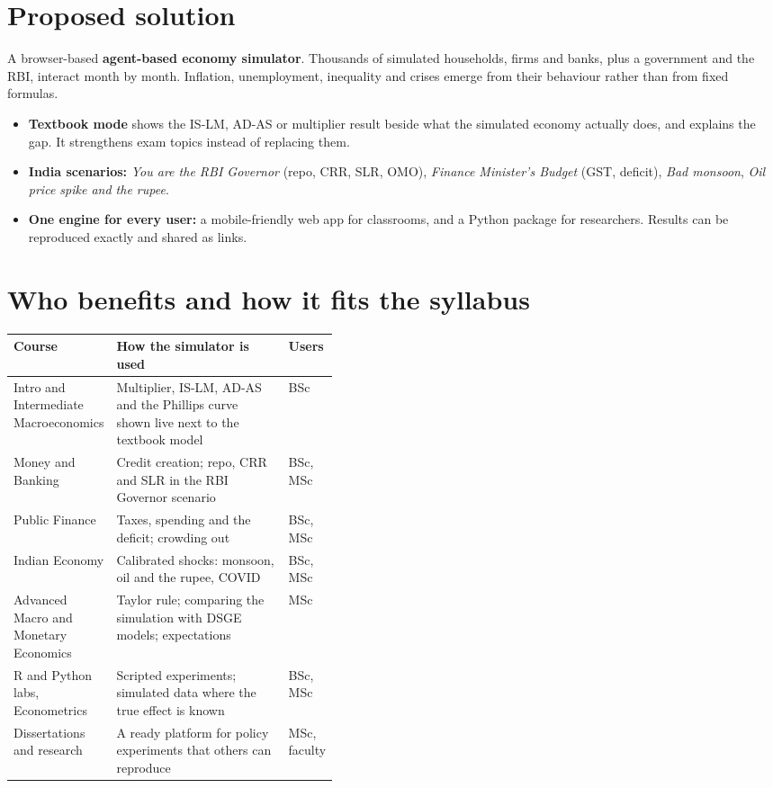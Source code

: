 \documentclass[10pt,a4paper]{article}
\begin{document}
\section{Proposed solution}
A browser-based \textbf{agent-based economy simulator}. Thousands of simulated households, firms and banks, plus a government and the RBI, interact month by month. Inflation, unemployment, inequality and crises emerge from their behaviour rather than from fixed formulas.
\begin{itemize}
  \item \textbf{Textbook mode} shows the IS-LM, AD-AS or multiplier result beside what the simulated economy actually does, and explains the gap. It strengthens exam topics instead of replacing them.
  \item \textbf{India scenarios:} \emph{You are the RBI Governor} (repo, CRR, SLR, OMO), \emph{Finance Minister's Budget} (GST, deficit), \emph{Bad monsoon}, \emph{Oil price spike and the rupee}.
  \item \textbf{One engine for every user:} a mobile-friendly web app for classrooms, and a Python package for researchers. Results can be reproduced exactly and shared as links.
\end{itemize}

\section{Who benefits and how it fits the syllabus}
{\footnotesize
\begin{tabularx}{\linewidth}{@{}>{\raggedright\arraybackslash}p{0.31\linewidth}X>{\raggedright\arraybackslash}p{0.11\linewidth}@{}}
\toprule
\textbf{Course} & \textbf{How the simulator is used} & \textbf{Users} \\
\midrule
Intro and Intermediate Macroeconomics & Multiplier, IS-LM, AD-AS and the Phillips curve shown live next to the textbook model & BSc \\
Money and Banking & Credit creation; repo, CRR and SLR in the RBI Governor scenario & BSc, MSc \\
Public Finance & Taxes, spending and the deficit; crowding out & BSc, MSc \\
Indian Economy & Calibrated shocks: monsoon, oil and the rupee, COVID & BSc, MSc \\
Advanced Macro and Monetary Economics & Taylor rule; comparing the simulation with DSGE models; expectations & MSc \\
R and Python labs, Econometrics & Scripted experiments; simulated data where the true effect is known & BSc, MSc \\
Dissertations and research & A ready platform for policy experiments that others can reproduce & MSc, faculty \\
\bottomrule
\end{tabularx}\par}
\end{document}
